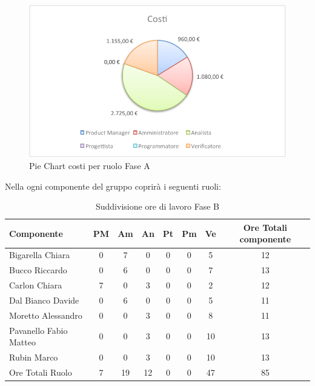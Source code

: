 				\begin{figure}[H]\centering
					\includegraphics[width=\textwidth]{PianoDiProgetto/Pics/ChartTotCostiFaseA.pdf}
					\caption{Pie Chart costi per ruolo Fase A}
				\end{figure}
				Nella  ogni componente del gruppo \groupname{} coprirà i seguenti ruoli:
				\begin{table}[H]
					\begin{center}
						\begin{tabular}{| l | c | c | c | c | c | c | c |}
							\hline
							Componente 				& PM	& Am 	& An 	& Pt 		& Pm 	& Ve 	& Ore Totali componente \\ \hline
							
							Bigarella Chiara 			& 0		& 7 		& 0		& 0		& 0		& 5 		& 12 \\
							Bucco Riccardo 			& 0		& 6 		& 0		& 0		& 0		& 7 		& 13 \\
							Carlon Chiara	 			& 7 		& 0		& 3 		& 0		& 0		& 2 		& 12 \\
							Dal Bianco Davide 			& 0		& 6 		& 0		& 0		& 0		& 5 		& 11 \\
							Moretto Alessandro 			& 0		& 0		& 3 		& 0		& 0		& 8 		& 11 \\
							Pavanello Fabio Matteo	 	& 0		& 0		& 3 		& 0		& 0		& 10 		& 13 \\
							Rubin Marco				& 0		& 0		& 3 		& 0		& 0		& 10 		& 13 \\ \hline \hline
							
							Ore Totali Ruolo 			& 7 		& 19 		& 12 		& 0		& 0		& 47 		& 85\\ \hline
						\end{tabular}
					\end{center}
					\caption{Suddivisione ore di lavoro Fase B}
				\end{table}
